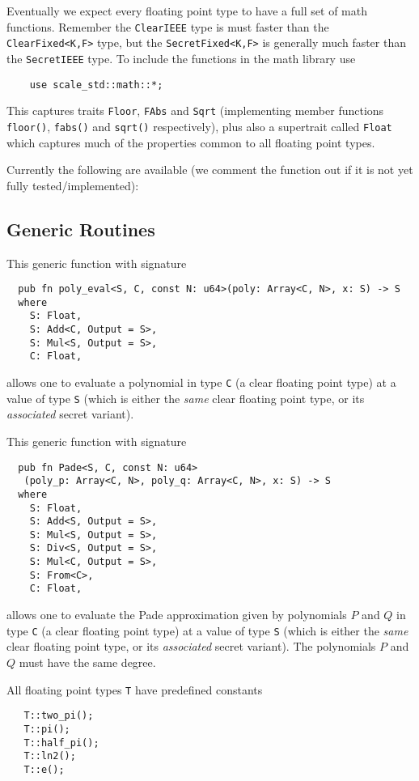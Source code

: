 Eventually we expect every floating point type to
have a full set of math functions. 
Remember the \verb|ClearIEEE| type is must faster than
the \verb|ClearFixed<K,F>| type, but the \verb|SecretFixed<K,F>| 
is generally much faster than the \verb|SecretIEEE| type.
To include the functions in the math library use
\begin{lstlisting}
    use scale_std::math::*;
\end{lstlisting}
This captures traits \verb|Floor|, \verb|FAbs|
and \verb|Sqrt| (implementing member functions
\verb|floor()|, \verb|fabs()| and \verb|sqrt()| respectively), 
plus also a supertrait called
\verb|Float| which captures much of the properties
common to all floating point types.

Currently the following are available (we comment the
function out if it is not yet fully tested/implemented):

\subsection{Generic Routines}

This generic function with signature
\begin{lstlisting}
  pub fn poly_eval<S, C, const N: u64>(poly: Array<C, N>, x: S) -> S
  where
    S: Float,
    S: Add<C, Output = S>,
    S: Mul<S, Output = S>,
    C: Float,
\end{lstlisting}
allows one to evaluate a polynomial in type \verb|C| 
(a clear floating point type) at a value of type 
\verb|S| (which is either the {\em same} clear floating
point type, or its {\em associated} secret variant).

This generic function with signature
\begin{lstlisting}
  pub fn Pade<S, C, const N: u64>
   (poly_p: Array<C, N>, poly_q: Array<C, N>, x: S) -> S
  where
    S: Float,
    S: Add<S, Output = S>,
    S: Mul<S, Output = S>,
    S: Div<S, Output = S>,
    S: Mul<C, Output = S>,
    S: From<C>,
    C: Float,
\end{lstlisting}
allows one to evaluate the Pade approximation given
by polynomials $P$ and $Q$ in type \verb|C|
(a clear floating point type) at a value of type
\verb|S| (which is either the {\em same} clear floating
point type, or its {\em associated} secret variant).
The polynomials $P$ and $Q$ must have the same degree.


All floating point types \verb|T| have predefined constants
\begin{lstlisting}
   T::two_pi();
   T::pi();
   T::half_pi();
   T::ln2();
   T::e();
\end{lstlisting}


